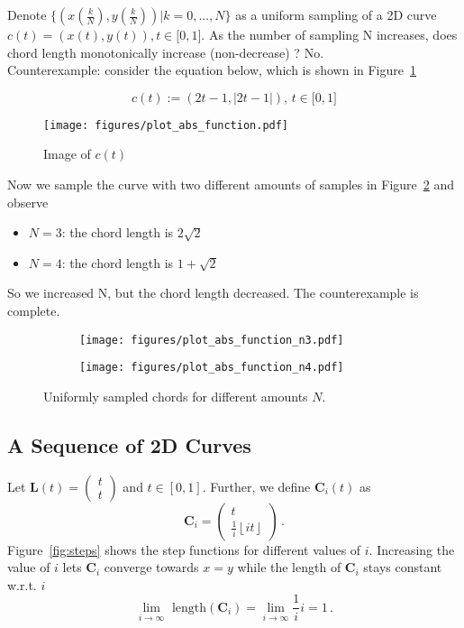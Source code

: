 \documentclass{scrartcl}
\begin{document}
Denote $\{(x(\frac{k}{N}), y(\frac{k}{N}))|k=0,...,N\}$ as a uniform sampling of a 2D curve
$c(t) = (x(t), y(t)), t \in \big[0,1\big]$. As the number of sampling N increases, does chord length monotonically
increase (non-decrease) ? No. \\
Counterexample: consider the equation below, which is shown in Figure~\ref{fig:abs}

\begin{equation}
c(t):=(2t-1, |2t-1|),\, t	\in \big[0,1\big]
\end{equation}

\begin{figure}[h]
	\centering
	\texttt{[image: figures/plot\_abs\_function.pdf]}
	\caption{Image of $c(t)$}
	\label{fig:abs}
\end{figure}

Now we sample the curve with two different amounts of samples in Figure~\ref{fig:sampled_abs} and observe
\begin{itemize}
	\item $N=3$: the chord length is $2\sqrt{2}$
	\item $N=4$: the chord length is $1 + \sqrt{2}$
\end{itemize}
So we increased N, but the chord length decreased. The counterexample is complete.

\begin{figure}[h]
	\begin{subfigure}{0.49\textwidth}
	\texttt{[image: figures/plot\_abs\_function\_n3.pdf]}
	\end{subfigure}
	\begin{subfigure}{0.49\textwidth}
	\texttt{[image: figures/plot\_abs\_function\_n4.pdf]}
	\end{subfigure}
	\caption{Uniformly sampled chords for different amounts $N$.}\label{fig:sampled_abs}
\end{figure}
\pagebreak
\subsection{A Sequence of 2D Curves}
Let $\mathbf{L}(t) = \begin{pmatrix}
	t \\ t
\end{pmatrix}$ and $t \in [0, 1]$.
Further, we define $\mathbf{C}_i(t)$ as
\begin{equation}
	\mathbf{C}_i = \begin{pmatrix}
		t \\ \frac{1}{i} \left\lfloor i t \right\rfloor
	\end{pmatrix} \, .
\end{equation}
Figure~\ref{fig:steps} shows the step functions for different values of $i$.
Increasing the value of $i$ lets $\mathbf{C}_i$ converge towards $x = y$ while
the length of $\mathbf{C}_i$ stays constant w.r.t. $i$
\begin{equation}
	\lim\limits_{i \rightarrow \infty} \text{ length}(\mathbf{C}_i) = \lim\limits_{i \rightarrow \infty} \frac{1}{i} i = 1\, .
\end{equation}
\end{document}

